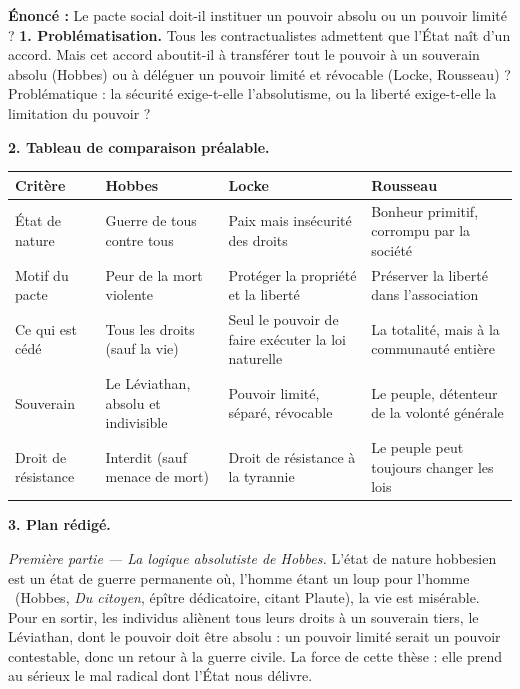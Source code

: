 \documentclass[11pt]{article}
\newcommand{\cle}[1]{{\popxbold\color{popdark}#1}}
\begin{document}
\begin{exoresolu}
\textbf{Énoncé :} Le pacte social doit-il instituer un pouvoir absolu ou un pouvoir limité ?
\tcblower
\textbf{1. Problématisation.} Tous les contractualistes admettent que l'État naît d'un accord. Mais cet accord aboutit-il à transférer tout le pouvoir à un souverain absolu (Hobbes) ou à déléguer un pouvoir limité et révocable (Locke, Rousseau) ? Problématique : la sécurité exige-t-elle l'absolutisme, ou la liberté exige-t-elle la limitation du pouvoir ?

\textbf{2. Tableau de comparaison préalable.}

\begin{center}
\begin{tabularx}{\linewidth}{|l|X|X|X|}
\hline
\rowcolor{popblueL} \textbf{Critère} & \textbf{Hobbes} & \textbf{Locke} & \textbf{Rousseau} \\
\hline
\cle{État de nature} & Guerre de tous contre tous & Paix mais insécurité des droits & Bonheur primitif, corrompu par la société \\
\hline
Motif du pacte & Peur de la mort violente & Protéger la \cle{propriété} et la liberté & Préserver la liberté dans l'association \\
\hline
Ce qui est cédé & Tous les droits (sauf la vie) & Seul le pouvoir de faire exécuter la loi naturelle & La totalité, mais à la communauté entière \\
\hline
\cle{Souverain} & Le Léviathan, absolu et indivisible & Pouvoir limité, séparé, révocable & Le peuple, détenteur de la \cle{volonté générale} \\
\hline
Droit de résistance & Interdit (sauf menace de mort) & Droit de résistance à la tyrannie & Le peuple peut toujours changer les lois \\
\hline
\end{tabularx}
\end{center}

\textbf{3. Plan rédigé.}

\emph{Première partie — La logique absolutiste de Hobbes.} L'état de nature hobbesien est un état de guerre permanente où, l'homme étant \guillemotleft un loup pour l'homme \guillemotright\ (Hobbes, \emph{Du citoyen}, épître dédicatoire, citant Plaute), la vie est misérable. Pour en sortir, les individus aliènent tous leurs droits à un souverain tiers, le Léviathan, dont le pouvoir doit être absolu : un pouvoir limité serait un pouvoir contestable, donc un retour à la guerre civile. La force de cette thèse : elle prend au sérieux le mal radical dont l'État nous délivre.


\end{exoresolu}
\end{document}
